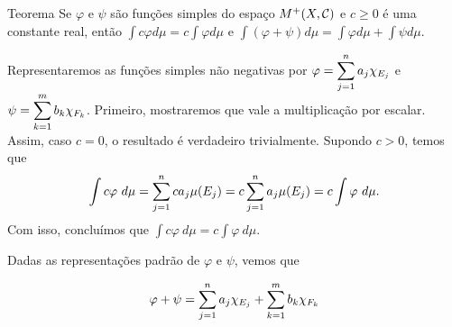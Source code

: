 \begin{env}{Teorema}
	\label{teo:aritmetica-com-integrais-de-funções-simples}
    Se $\varphi$ e $\psi$ são funções simples do espaço $M^+(X,\operatorname{\mathcal{C}})$ e $c\geq0$ é uma constante real, então
    $
    \displaystyle \int c\varphi d\mu = c \int \varphi d\mu
    $
	e
    $
    \displaystyle \int (\varphi + \psi) d\mu = \int \varphi d\mu + \int \psi d\mu.
    $
\end{env}
\begin{prova}
    Representaremos as funções simples não negativas por $\varphi = \displaystyle \sum_{j = 1}^n a_j\chi_{E_j}$ e $\psi = \displaystyle \sum_{k = 1}^m b_k\chi_{F_k}$.
    Primeiro, mostraremos que vale a multiplicação por escalar.
    Assim, caso $c = 0$, o resultado é verdadeiro trivialmente. 
    Supondo $c> 0$, temos que
    $$\int c \varphi\ d\mu = \dsum_{j = 1}^n c a_j\mu(E_j) = c \dsum_{j = 1}^n a_j\mu(E_j) = c\int \varphi \ d\mu.$$
    Com isso, concluímos que $\displaystyle \int c \varphi\ d\mu = c\int \varphi \ d\mu.$ 
    
    Dadas as representações padrão de $\varphi$ e $\psi$, vemos que
    
    \begin{equation}
    	\label{eq:somatorio funções simples}
    	\varphi +\psi
    	=
    	\displaystyle \sum_{j = 1}^n a_j\chi_{E_j}
    	+
    	\displaystyle \sum_{k = 1}^m b_k\chi_{F_k}
    \end{equation}
    

\end{prova}

